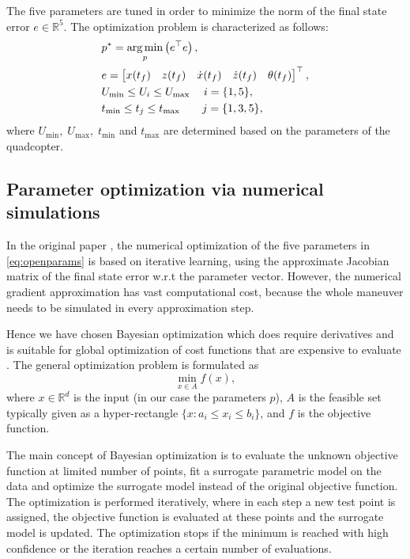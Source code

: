 The five parameters are tuned in order to minimize the norm of the final state error $e\in\mathbb{R}^5$. The optimization problem is characterized as follows:
\begin{subequations}\label{eq:optim}
\begin{align}
&p^* = \operatorname*{arg\,min}_p \left(e^\top e\right),\\
&e = \begin{bmatrix}x(t_f) & z(t_f) & \dot{x}(t_f) & \dot{z}(t_f)& \theta(t_f)\end{bmatrix}^\top,\label{eq:bayeserror}\\
&U_\mathrm{min}\leq U_i\leq U_\mathrm{max}\quad\; i=\{1,5\},\\
&t_\mathrm{min}\leq t_j \leq t_\mathrm{max}\quad\quad j=\{1,3,5\},
\end{align} 
\end{subequations}
where $U_\mathrm{min},\; U_\mathrm{max},\; t_\mathrm{min}$ and $t_\mathrm{max}$ are determined based on the parameters of the quadcopter.

\subsection{Parameter optimization via numerical simulations}
In the original paper \cite{LSICRA2010}, the numerical optimization of the five parameters in \eqref{eq:openparams} is based on iterative learning, using the approximate Jacobian matrix of the final state error w.r.t the parameter vector. However, the numerical gradient approximation has vast computational cost, because the whole maneuver needs to be simulated in every approximation step. 

Hence we have chosen Bayesian optimization which does require derivatives and is suitable for global optimization of cost functions that are expensive to evaluate \cite{frazier2018tutorial, bayesopt2, brochu2010tutorial}. The general optimization problem is formulated as
\begin{equation}
    \min_{x\in A} f(x),
\end{equation}
where $x\in \mathbb{R}^d$ is the input (in our case the parameters $p$), $A$ is the feasible set typically given as a hyper-rectangle $\{x:a_i\leq x_i \leq b_i\}$, and $f$ is the objective function.%

The main concept of Bayesian optimization is to evaluate the unknown objective function at limited number of points, fit a surrogate parametric model on the data and optimize the surrogate model instead of the original objective function. The optimization is performed iteratively, where in each step a new test point is assigned, the objective function is evaluated at these points and the surrogate model is updated. The optimization stops if the minimum is reached with high confidence or the iteration reaches a certain number of evaluations. 


